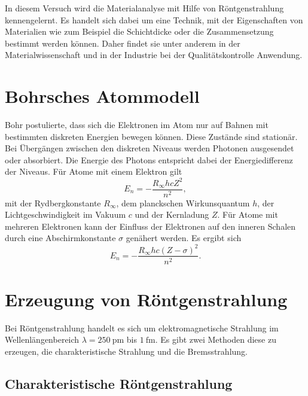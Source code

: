 In diesem Versuch wird die Materialanalyse mit Hilfe von Röntgenstrahlung kennengelernt. Es handelt sich dabei um eine Technik, mit der Eigenschaften von Materialien wie zum Beispiel die Schichtdicke oder die Zusammensetzung bestimmt werden können. Daher findet sie unter anderem in der Materialwissenschaft und in der Industrie bei der Qualitätskontrolle Anwendung.


\section{Bohrsches Atommodell}

Bohr postulierte, dass sich die Elektronen im Atom nur auf Bahnen mit bestimmten diskreten Energien bewegen können. Diese Zustände sind stationär. Bei Übergängen zwischen den diskreten Niveaus werden Photonen ausgesendet oder absorbiert. 
Die Energie des Photons entspricht dabei der Energiedifferenz der Niveaus. Für Atome mit einem Elektron gilt
\begin{equation}
 E_{n} = -\frac{R_{\infty}hcZ^{2}}{n^{2}},
\end{equation}
mit der Rydbergkonstante $R_{\infty}$, dem planckschen Wirkunsquantum $h$, der Lichtgeschwindigkeit im Vakuum $c$ und der Kernladung $Z$. Für Atome mit mehreren Elektronen kann der Einfluss der Elektronen auf den inneren Schalen durch eine Abschirmkonstante $\sigma$ genähert werden. Es ergibt sich
\begin{equation}
 E_{n} = -\frac{R_{\infty}hc(Z-\sigma)^{2}}{n^{2}}.
\end{equation}

\section{Erzeugung von Röntgenstrahlung}

Bei Röntgenstrahlung handelt es sich um elektromagnetische Strahlung im Wellenlängenbereich $\lambda=\SI{250}{\pico\metre}$ bis $\SI{1}{\femto\metre}$. Es gibt zwei Methoden diese zu erzeugen, die charakteristische Strahlung und die Bremsstrahlung.

\subsection{Charakteristische Röntgenstrahlung}

